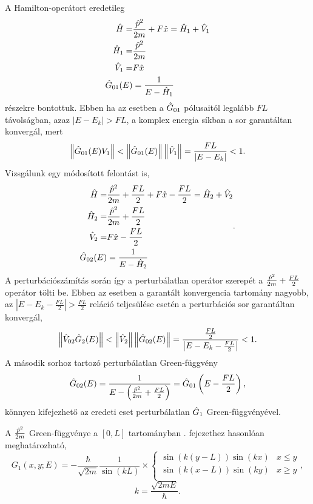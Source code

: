A Hamilton-operátort eredetileg
\begin{equation}
	\begin{aligned}
		\hat{H}=&\frac{\hat{p}^2}{2m}+F\hat{x}=\hat{H}_1+\hat{V}_1\\
		\hat{H}_1=&\frac{\hat{p}^2}{2m}\\
		\hat{V}_1=&F\hat{x}\\
		\hat{G}_{01}(E)&=\frac{1}{E-\hat{H}_1}
	\end{aligned}
\end{equation}
részekre bontottuk. Ebben ha az esetben a $\hat{G}_{01}$ pólusaitól legalább $FL$ távolságban, azaz $\rvert E-E_k\lvert>FL$, a komplex energia síkban a sor garantáltan konvergál, mert
\begin{equation}
	\left\lVert \hat{G}_{01}(E)V_1 \right\rVert<\left\lVert \hat{G}_{01}(E) \right\rVert\left\lVert \hat{V}_1 \right\rVert=\frac{FL}{\rvert E-E_k\lvert}<1.
\end{equation}
Vizsgálunk egy módosított felontást is,
\begin{equation}
	\begin{aligned}
		\hat{H}=&\frac{\hat{p}^2}{2m}+\frac{FL}{2}+F\hat{x}-\frac{FL}{2}=\hat{H}_2+\hat{V}_2\\
		\hat{H}_2=&\frac{\hat{p}^2}{2m}+\frac{FL}{2}\\
		\hat{V}_2=&F\hat{x}-\frac{FL}{2}\\
		\hat{G}_{02}(E)&=\frac{1}{E-\hat{H}_2}
	\end{aligned}.
\end{equation}
A perturbációszámítás során így a perturbálatlan operátor szerepét a $\frac{\hat{p}^2}{2m}+\frac{FL}{2}$ operátor tölti be.
Ebben az esetben a garantált konvergencia tartomány nagyobb, az $\left\lvert E-E_k-\frac{FL}{2}\right\rvert > \frac{FL}{2}$ reláció teljesülése esetén a perturbációs sor garantáltan konvergál,
\begin{equation}
	\left\lVert \hat{V}_{02}\hat{G}_2(E) \right\rVert<\left\lVert \hat{V}_2 \right\rVert\left\lVert \hat{G}_{02}(E) \right\rVert=\frac{\frac{FL}{2}}{\left\lvert E-E_k-\frac{FL}{2}\right\rvert}<1.
	\label{perturbation:convradius}
\end{equation}
A második sorhoz tartozó perturbálatlan Green-függvény
\begin{equation}
	\hat{G}_{02}(E)=\frac{1}{E-\left(\frac{\hat{p}^2}{2m}+\frac{FL}{2}\right)}=\hat{G}_{01}\left(E-\frac{FL}{2}\right),
\end{equation}
könnyen kifejezhető az eredeti eset perturbálatlan $\hat{G}_1$ Green-függvényével.

A $\frac{\hat{p}^2}{2m}$ Green-függvénye a $[0,L]$ tartományban . fejezethez hasonlóan meghatározható,
\begin{equation}
	G_1\left(x,y;E\right) = -\frac{\hbar}{\sqrt{2m}}\frac{1}{\sin\left(kL\right)}\times
	\begin{cases}
		\sin\left(k\left(y-L\right)\right)\sin\left(kx\right) & x\leq y\\
		\sin\left(k\left(x-L\right)\right)\sin\left(ky\right) & x\geq y\\
	\end{cases},
\end{equation}
\begin{equation}
	k = \frac{\sqrt{2mE}}{\hbar}.
\end{equation}

